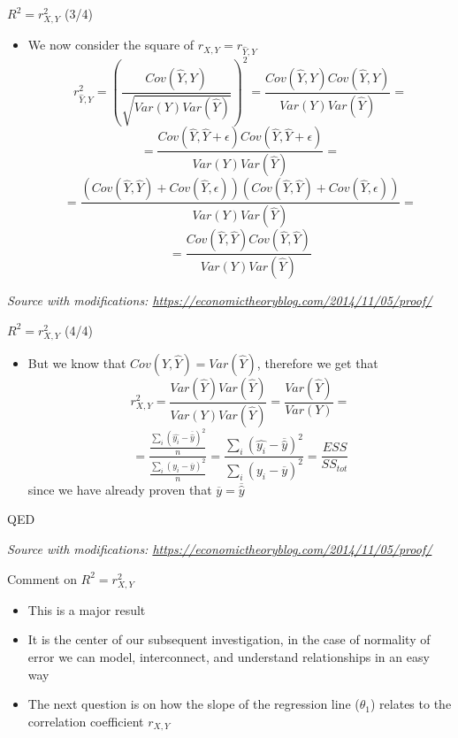\documentclass{beamer}
\begin{document}
\begin{frame}
{\centerline{$R^2 = r_{X,Y}^2$ (3/4)}}
\begin{itemize}
\item We now consider the square of $r_{X,Y} = r_{\hat{Y},Y}$
$$r_{\hat{Y},Y}^2= \left ( \frac{Cov(\hat{Y},Y)}{\sqrt{Var(Y)Var(\hat{Y})}} \right )^2 =  \frac{Cov(\hat{Y},Y)Cov(\hat{Y},Y)}{Var(Y)Var(\hat{Y})} = $$
$$ = \frac{Cov(\hat{Y},\hat{Y} + \epsilon)Cov(\hat{Y},\hat{Y} + \epsilon)}{Var(Y)Var(\hat{Y})} = $$
$$ 
= \frac{(Cov(\hat{Y},\hat{Y})+ Cov(\hat{Y},\epsilon))(Cov(\hat{Y},\hat{Y})+ Cov(\hat{Y},\epsilon))}{Var(Y)Var(\hat{Y})} = $$
$$ 
= \frac{Cov(\hat{Y},\hat{Y})Cov(\hat{Y},\hat{Y})}{Var(Y)Var(\hat{Y})} $$


\end{itemize}

\textit{\small
Source with modifications: \url{https://economictheoryblog.com/2014/11/05/proof/}}
\end{frame}
\begin{frame}
{\centerline{$R^2 = r_{X,Y}^2$ (4/4)}}
\begin{itemize}
\item But we know that $Cov(\hat{Y},\hat{Y}) = Var(\hat{Y})$, therefore we get that
$$r_{X,Y}^2 = \frac{Var(\hat{Y})Var(\hat{Y})}{Var(Y)Var(\hat{Y})} = \frac{Var(\hat{Y})}{Var(Y)}=$$
$$ = \frac{\frac{\sum_i{(\hat{y_i}-\overline{\hat{y}})^2}}{n}}{\frac{\sum_i(y_i-\overline{y})^2}{n}}
= \frac{{\sum_i{(\hat{y_i}-\overline{\hat{y}})^2}}}{\sum_i(y_i-\overline{y})^2} =  \frac{ESS}{SS_{tot}} $$
since we have already proven that $\overline{y} = \overline{\hat{y}}$
\end{itemize}
QED

\textit{\small
Source with modifications: \url{https://economictheoryblog.com/2014/11/05/proof/}}
\end{frame}

\begin{frame}
{\centerline{Comment on $R^2 = r_{X,Y}^2$ }}
\begin{itemize}
\item This is a major result\\
\item It is the center of our subsequent investigation, in the case of normality of error we can model, interconnect, and understand relationships in an easy way\\
\item The next question is on how the slope of the regression line ($\theta_1$) relates to the correlation coefficient $r_{X,Y}$

\end{itemize}

\end{frame}
\end{document}
